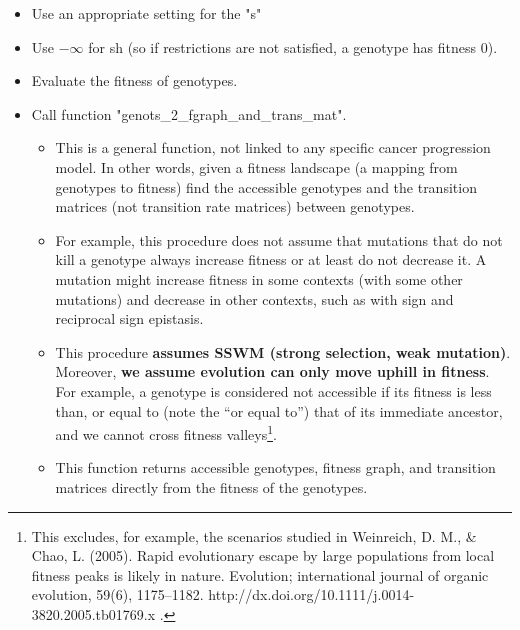 \documentclass[11pt]{article}
\begin{document}
\begin{itemize}
\item Use an appropriate setting for the "s"
\item Use \(-\infty\) for sh (so if restrictions are not satisfied, a genotype has
fitness 0).
\item Evaluate the fitness of genotypes.
\item Call function "genots\_2\_fgraph\_and\_trans\_mat".
\begin{itemize}
\item This is a general function, not linked to any specific cancer progression model. In other words, given a fitness landscape (a mapping from genotypes to fitness) find the accessible genotypes and the transition matrices (not transition rate matrices) between genotypes.
\item For example, this procedure does not assume that mutations that do not kill a genotype always increase fitness or at least do not decrease it. A mutation might increase fitness in some contexts (with some other mutations) and decrease in other contexts, such as with sign and reciprocal sign epistasis.
\item This procedure \textbf{assumes SSWM (strong selection, weak mutation)}. Moreover, \textbf{we assume evolution can only move uphill in fitness}. For example, a genotype is considered not accessible if its fitness is less than, or equal to (note the ``or equal to'') that of its immediate ancestor, and we cannot cross fitness valleys\footnote{This excludes, for example, the scenarios studied in  Weinreich, D. M., \& Chao, L. (2005). Rapid evolutionary escape by large
  populations from local fitness peaks is likely in nature. Evolution;
  international journal of organic evolution, 59(6),
  1175–1182. http://dx.doi.org/10.1111/j.0014-3820.2005.tb01769.x .}.
\item This function returns accessible genotypes, fitness graph, and transition matrices directly from the fitness of the genotypes.
\end{itemize}
\end{itemize}
\end{document}
